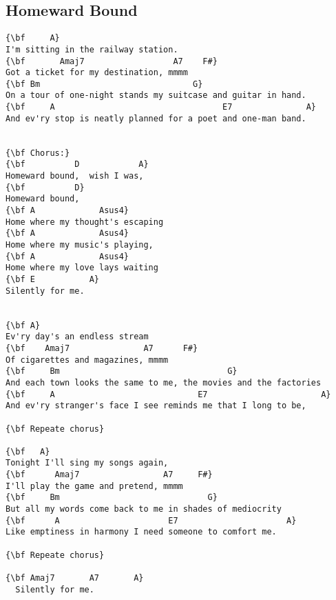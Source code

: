 \documentclass[a4paper]{article}
\begin{document}
\subsection{Homeward Bound} %
\label{sub:Homeward Bou}
\begin{Verbatim}[commandchars=\\\{\}]
{\bf     A}
I'm sitting in the railway station.
{\bf       Amaj7                  A7    F#}
Got a ticket for my destination, mmmm
{\bf Bm                               G}
On a tour of one-night stands my suitcase and guitar in hand.
{\bf     A                                  E7               A}
And ev'ry stop is neatly planned for a poet and one-man band.


{\bf Chorus:}
{\bf          D            A}
Homeward bound,  wish I was,
{\bf          D}
Homeward bound,
{\bf A             Asus4}
Home where my thought's escaping
{\bf A             Asus4}
Home where my music's playing,
{\bf A             Asus4}
Home where my love lays waiting
{\bf E           A}
Silently for me.


{\bf A}
Ev'ry day's an endless stream
{\bf    Amaj7               A7      F#}
Of cigarettes and magazines, mmmm
{\bf     Bm                                  G}
And each town looks the same to me, the movies and the factories
{\bf     A                             E7                       A}
And ev'ry stranger's face I see reminds me that I long to be,

{\bf Repeate chorus}

{\bf   A}
Tonight I'll sing my songs again,
{\bf      Amaj7                 A7     F#}
I'll play the game and pretend, mmmm
{\bf     Bm                              G}
But all my words come back to me in shades of mediocrity
{\bf      A                      E7                      A}
Like emptiness in harmony I need someone to comfort me.

{\bf Repeate chorus}

{\bf Amaj7       A7       A}
  Silently for me.
\end{Verbatim}
\newpage
\end{document}
